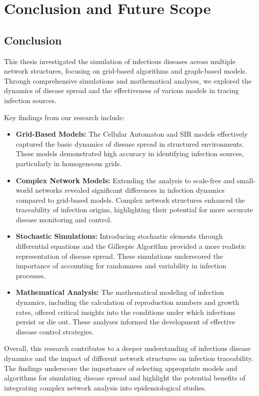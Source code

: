 \chapter{Conclusion and Future Scope}

\section{Conclusion}
This thesis investigated the simulation of infectious diseases across multiple network structures, focusing on grid-based algorithms and graph-based models. Through comprehensive simulations and mathematical analyses, we explored the dynamics of disease spread and the effectiveness of various models in tracing infection sources.

Key findings from our research include:
\begin{itemize}
    \item \textbf{Grid-Based Models:} The Cellular Automaton and SIR models effectively captured the basic dynamics of disease spread in structured environments. These models demonstrated high accuracy in identifying infection sources, particularly in homogeneous grids.
    \item \textbf{Complex Network Models:} Extending the analysis to scale-free and small-world networks revealed significant differences in infection dynamics compared to grid-based models. Complex network structures enhanced the traceability of infection origins, highlighting their potential for more accurate disease monitoring and control.
    \item \textbf{Stochastic Simulations:} Introducing stochastic elements through differential equations and the Gillespie Algorithm provided a more realistic representation of disease spread. These simulations underscored the importance of accounting for randomness and variability in infection processes.
    \item \textbf{Mathematical Analysis:} The mathematical modeling of infection dynamics, including the calculation of reproduction numbers and growth rates, offered critical insights into the conditions under which infections persist or die out. These analyses informed the development of effective disease control strategies.
\end{itemize}

Overall, this research contributes to a deeper understanding of infectious disease dynamics and the impact of different network structures on infection traceability. The findings underscore the importance of selecting appropriate models and algorithms for simulating disease spread and highlight the potential benefits of integrating complex network analysis into epidemiological studies.

